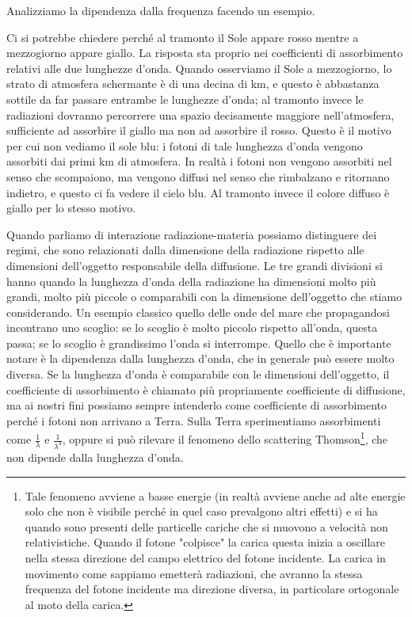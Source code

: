 Analizziamo la dipendenza dalla frequenza facendo un esempio.


Ci si potrebbe chiedere perché al tramonto il Sole appare rosso mentre a mezzogiorno appare giallo. La risposta sta proprio nei coefficienti di assorbimento relativi alle due lunghezze d'onda. Quando osserviamo il Sole a mezzogiorno, lo strato di atmosfera schermante è di una decina di km, e questo è abbastanza sottile da far passare entrambe le lunghezze d'onda; al tramonto invece le radiazioni dovranno percorrere una spazio decisamente maggiore nell'atmosfera, sufficiente ad assorbire il giallo ma non ad assorbire il rosso. Questo è il motivo per cui non vediamo il sole blu: i fotoni di tale lunghezza d'onda vengono assorbiti dai primi km di atmosfera. In realtà i fotoni non vengono assorbiti nel senso che scompaiono, ma vengono diffusi nel senso che rimbalzano e ritornano indietro, e questo ci fa vedere il cielo blu. Al tramonto invece il colore diffuso è giallo per lo stesso motivo.

Quando parliamo di interazione radiazione-materia possiamo distinguere dei regimi, che sono relazionati dalla dimensione della radiazione rispetto alle dimensioni dell'oggetto responsabile della diffusione. Le tre grandi divisioni si hanno quando la lunghezza d'onda della radiazione ha dimensioni molto più grandi, molto più piccole o comparabili con la dimensione dell'oggetto che stiamo considerando. Un esempio classico quello delle onde del mare che propagandosi incontrano uno scoglio: se lo scoglio è molto piccolo rispetto all'onda, questa passa; se lo scoglio è grandissimo l'onda si interrompe. Quello che è importante notare è la dipendenza dalla lunghezza d'onda, che in generale può essere molto diversa. Se la lunghezza d'onda è comparabile con le dimensioni dell'oggetto, il coefficiente di assorbimento è chiamato più propriamente coefficiente di diffusione, ma ai nostri fini possiamo sempre intenderlo come coefficiente di assorbimento perché i fotoni non arrivano a Terra. Sulla Terra sperimentiamo assorbimenti come $\frac{1}{\lambda}$ e $\frac{1}{\lambda^4}$, oppure si può rilevare il fenomeno dello scattering Thomson\footnote{Tale fenomeno avviene a basse energie (in realtà avviene anche ad alte energie solo che non è visibile perché in quel caso prevalgono altri effetti) e si ha quando sono presenti delle particelle cariche che si muovono a velocità non relativistiche. Quando il fotone "colpisce" la carica questa inizia a oscillare nella stessa direzione del campo elettrico del fotone incidente. La carica in movimento come sappiamo emetterà radiazioni, che avranno la stessa frequenza del fotone incidente ma direzione diversa, in particolare ortogonale al moto della carica.}, che non dipende dalla lunghezza d'onda.

